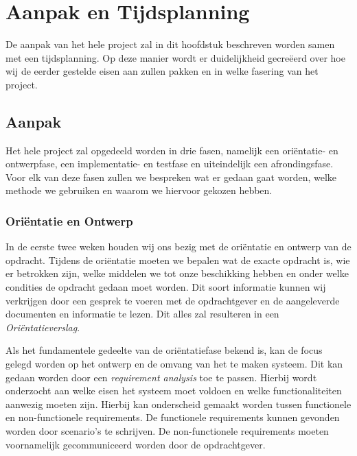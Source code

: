 \section{Aanpak en Tijdsplanning}
De aanpak van het hele project zal in dit hoofdstuk beschreven worden samen met een tijdsplanning. Op deze manier wordt er duidelijkheid gecre\"eerd over hoe wij de eerder gestelde eisen aan zullen pakken en in welke fasering van het project.

\subsection{Aanpak}
Het hele project zal opgedeeld worden in drie fasen, namelijk een ori\"entatie- en ontwerpfase, een implementatie- en testfase en uiteindelijk een afrondingsfase. Voor elk van deze fasen zullen we bespreken wat er gedaan gaat worden, welke methode we gebruiken en waarom we hiervoor gekozen hebben. 

\subsubsection{Ori\"entatie en Ontwerp}
In de eerste twee weken houden wij ons bezig met de ori\"entatie en ontwerp van de opdracht. Tijdens de ori\"entatie moeten we bepalen wat de exacte opdracht is, wie er betrokken zijn, welke middelen we tot onze beschikking hebben en onder welke condities de opdracht gedaan moet worden. Dit soort informatie kunnen wij verkrijgen door een gesprek te voeren met de opdrachtgever en de aangeleverde documenten en informatie te lezen. Dit alles zal resulteren in een \emph{Ori\"entatieverslag}.

Als het fundamentele gedeelte van de ori\"entatiefase bekend is, kan de focus gelegd worden op het ontwerp en de omvang van het te maken systeem. Dit kan gedaan worden door een \emph{requirement analysis} toe te passen. Hierbij wordt onderzocht aan welke eisen het systeem moet voldoen en welke functionaliteiten aanwezig moeten zijn. Hierbij kan onderscheid gemaakt worden tussen functionele en non-functionele requirements. De functionele requirements kunnen gevonden worden door scenario's te schrijven. De non-functionele requirements moeten voornamelijk gecommuniceerd worden door de opdrachtgever.

